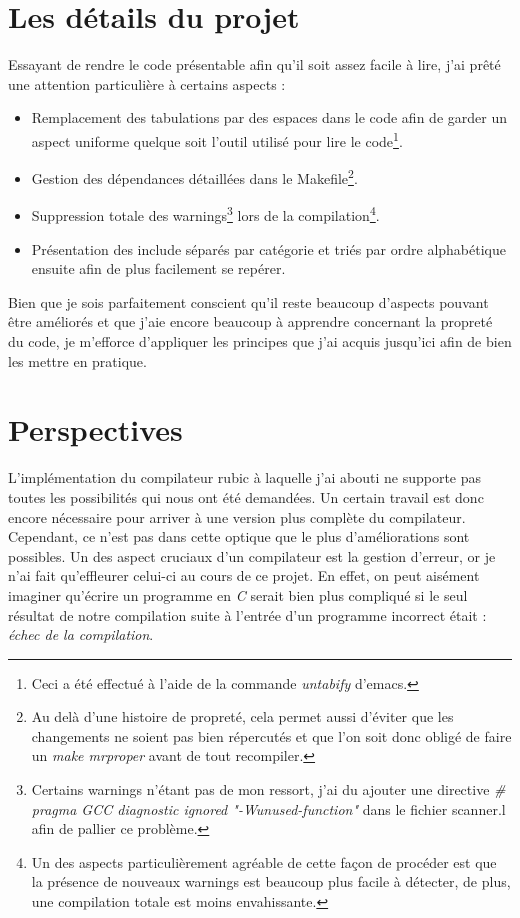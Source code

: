 \documentclass[12pt]{article}
\begin{document}
\section{Les détails du projet}
Essayant de rendre le code présentable afin qu'il soit assez facile à lire,
j'ai prêté une attention particulière à certains aspects :
\begin{itemize}
\item Remplacement des tabulations par des espaces dans le code afin de garder
  un aspect uniforme quelque soit l'outil utilisé pour lire le code\footnote{
    Ceci a été effectué à l'aide de la commande {\em untabify} d'emacs.}.
\item Gestion des dépendances détaillées dans le Makefile\footnote{Au delà
  d'une histoire de propreté, cela permet aussi d'éviter que les changements
  ne soient pas bien répercutés et que l'on soit donc obligé de faire un
  {\em make mrproper} avant de tout recompiler.}.
\item Suppression totale des warnings\footnote{Certains warnings n'étant pas
  de mon ressort, j'ai du ajouter une directive {\em \# pragma GCC diagnostic
    ignored "-Wunused-function"} dans le fichier scanner.l afin de pallier ce
  problème.} lors de la compilation\footnote{Un des aspects particulièrement
  agréable de cette façon de procéder est que la présence de nouveaux warnings
  est beaucoup plus facile à détecter, de plus, une compilation totale est
  moins envahissante.}.
\item Présentation des include séparés par catégorie et triés par ordre
  alphabétique ensuite afin de plus facilement se repérer.
\end{itemize} 

Bien que je sois parfaitement conscient qu'il reste beaucoup d'aspects pouvant
être améliorés et que j'aie encore beaucoup à apprendre concernant la propreté
du code, je m'efforce d'appliquer les principes que j'ai acquis jusqu'ici afin
de bien les mettre en pratique.

\section{Perspectives}
L'implémentation du compilateur rubic à laquelle j'ai abouti ne supporte pas
toutes les possibilités qui nous ont été demandées. Un certain travail
est donc encore nécessaire pour arriver à une version plus complète du
compilateur. Cependant, ce n'est pas dans cette optique que le plus
d'améliorations sont possibles. Un des aspect cruciaux d'un compilateur est la
gestion d'erreur, or je n'ai fait qu'effleurer celui-ci au cours de ce projet.
En effet, on peut aisément imaginer qu'écrire un programme en {\em C} serait
bien plus compliqué si le seul résultat de notre compilation suite à l'entrée
d'un programme incorrect était : {\em échec de la compilation}.\\
\end{document}
